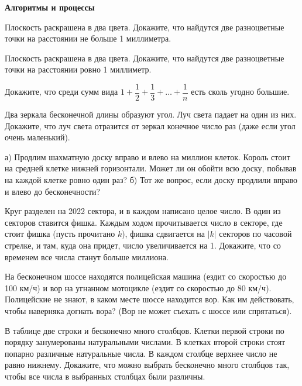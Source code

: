 \documentclass{article}
\begin{document}
    \large

    \begin{center}
        \textbf{Алгоритмы и процессы}
    \end{center}

    \begin{enumerate_boxed}

        \item Плоскость раскрашена в два цвета.
        Докажите, что найдутся две разноцветные точки на расстоянии не больше 1 миллиметра.

        \item Плоскость раскрашена в два цвета.
        Докажите, что найдутся две разноцветные точки на расстоянии ровно 1 миллиметр.

        \item Докажите, что среди сумм вида $1+\dfrac{1}{2} +\dfrac{1}{3}+\dotsc+\dfrac{1}{n}$ есть сколь угодно большие.

        \item  Два зеркала бесконечной длины образуют угол.
        Луч света падает на один из них.
        Докажите, что луч света отразится от зеркал конечное число раз (даже если угол очень маленький).

        \item
        а) Продлим шахматную доску вправо и влево на миллион клеток.
        Король стоит на средней клетке нижней горизонтали.
        Может ли он обойти всю доску, побывав на каждой клетке ровно один раз?
        б) Тот же вопрос, если доску продлили вправо и влево до бесконечности?

        \item Круг разделен на 2022 сектора, и в каждом написано целое число.
        В один из секторов ставится фишка.
        Каждым ходом прочитывается число в секторе, где стоит фишка (пусть прочитано $k$), фишка сдвигается на $|k|$ секторов по часовой стрелке, и там, куда она придет, число увеличивается на 1.
        Докажите, что со временем все числа станут больше миллиона.

        \item На бесконечном шоссе находятся полицейская машина (ездит со скоростью до 100 км/ч) и вор на угнанном мотоцикле (ездит со скоростью до 80 км/ч).
        Полицейские не знают, в каком месте шоссе находится вор.
        Как им действовать, чтобы наверняка догнать вора?
        (Вор не может съехать с шоссе или спрятаться).

        \item В таблице две строки и бесконечно много столбцов.
        Клетки первой строки по порядку занумерованы натуральными числами.
        В клетках второй строки стоят попарно различные натуральные числа.
        В каждом столбце верхнее число не равно нижнему.
        Докажите, что можно выбрать бесконечно много столбцов так, чтобы все числа в выбранных столбцах были различны.


\end{enumerate_boxed}
\end{document}
